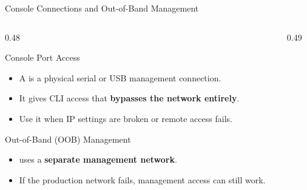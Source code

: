 \documentclass[aspectratio=169]{beamer}  %
\begin{document}
\begin{frame}[t]{Console Connections and Out-of-Band Management}
    \begin{columns}[T]
        \begin{column}{0.48\textwidth}
            \begin{block}{Console Port Access}
                \begin{itemize}
                    \footnotesize
                    \item A  is a physical serial or USB management connection.
                    \item It gives CLI access that \textbf{bypasses the network entirely}.
                    \item Use it when IP settings are broken or remote access fails.
                \end{itemize}
            \end{block}
            \vspace{0.1em}
            \begin{block}{Out-of-Band (OOB) Management}
                \begin{itemize}
                    \footnotesize
                    \item {} uses a \textbf{separate management network}.
                    \item If the production network fails, management access can still work.
                \end{itemize}
            \end{block}
        \end{column}
        \begin{column}{0.49\textwidth}
            \begin{center}
\end{center}
\end{column}
\end{columns}
\end{frame}
\end{document}
